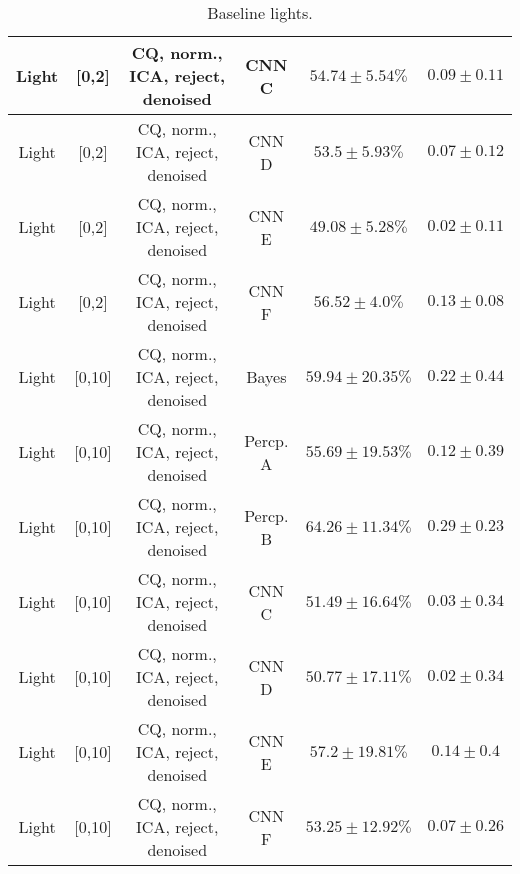 \begin{table}[!htb]
{\begin{tabular}{c|c|c|c|c|c}
    \hline
    Light               & [0,2]                                & \scriptsize{CQ, norm., ICA, reject, denoised} & CNN C                 &  $54.74 \pm 5.54\%$   & $0.09 \pm 0.11$\\  
    \hline
    Light               & [0,2]                                & \scriptsize{CQ, norm., ICA, reject, denoised} & CNN D                 &  $53.5 \pm 5.93\%$    & $0.07 \pm 0.12$\\  
    \hline
    Light               & [0,2]                                & \scriptsize{CQ, norm., ICA, reject, denoised} & CNN E                 &  $49.08 \pm 5.28\%$   & $0.02 \pm 0.11$\\  
    \hline
    Light               & [0,2]                                & \scriptsize{CQ, norm., ICA, reject, denoised} & CNN F                 &  $56.52 \pm 4.0\%$    & $0.13 \pm 0.08$\\  
    \hline
    Light               & [0,10]                               & \scriptsize{CQ, norm., ICA, reject, denoised} & Bayes                 &  $59.94 \pm 20.35\%$  & $0.22 \pm 0.44$\\  
    \hline
    Light               & [0,10]                               & \scriptsize{CQ, norm., ICA, reject, denoised} & Percp. A              &  $55.69 \pm 19.53\%$  & $0.12 \pm 0.39$\\  
    \hline
    Light               & [0,10]                               & \scriptsize{CQ, norm., ICA, reject, denoised} & Percp. B              &  $64.26 \pm 11.34\%$  & $0.29 \pm 0.23$\\  
    \hline
    Light               & [0,10]                               & \scriptsize{CQ, norm., ICA, reject, denoised} & CNN C                 &  $51.49 \pm 16.64\%$  & $0.03 \pm 0.34$\\  
    \hline
    Light               & [0,10]                               & \scriptsize{CQ, norm., ICA, reject, denoised} & CNN D                 &  $50.77 \pm 17.11\%$  & $0.02 \pm 0.34$\\  
    \hline
    Light               & [0,10]                               & \scriptsize{CQ, norm., ICA, reject, denoised} & CNN E                 &  $57.2 \pm 19.81\%$   & $0.14 \pm 0.4$\\   
    \hline
    Light               & [0,10]                               & \scriptsize{CQ, norm., ICA, reject, denoised} & CNN F                 &  $53.25 \pm 12.92\%$  & $0.07 \pm 0.26$\\   
    \hline
\end{tabular}
}
\caption{Baseline lights.}
\label{tab:lights-denoised+reject-app}
\end{table}